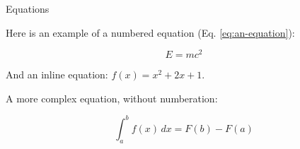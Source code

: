 \begin{frame}{Equations}

  Here is an example of a numbered equation (Eq. \ref{eq:an-equation}):

  \begin{equation}
    E = mc^2
    \label{eq:an-equation}
  \end{equation}

  And an inline equation: \( f(x) = x^2 + 2x + 1 \).

  A more complex equation, without numberation:

  \begin{equation*}
    \int_{a}^{b} f(x) \, dx = F(b) - F(a)
  \end{equation*}
\end{frame}
